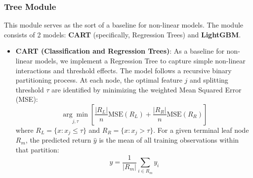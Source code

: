\documentclass[11pt]{article}
\begin{document}
\subsubsection{Tree Module}
This module serves as the sort of a baseline for non-linear models. The module consists of 2 models: \textbf{CART} (specifically, Regression Trees) and \textbf{LightGBM}.
\begin{itemize}
    \item \textbf{CART (Classification and Regression Trees)}:
    As a baseline for non-linear models, we implement a Regression Tree to capture simple non-linear interactions and threshold effects. The model follows a recursive binary partitioning process. At each node, the optimal feature $j$ and splitting threshold $\tau$ are identified by minimizing the weighted Mean Squared Error (MSE):
    \[
    \underset{j, \tau}{\arg\min} \left[ \frac{|R_L|}{n} \text{MSE}(R_L) + \frac{|R_R|}{n} \text{MSE}(R_R) \right]
    \]
    where $R_L = \{x : x_j \leq \tau\}$ and $R_R = \{x : x_j > \tau\}$. For a given terminal leaf node $R_m$, the predicted return $\hat{y}$ is the mean of all training observations within that partition:
    \[
    \hat{y} = \frac{1}{|R_m|} \sum_{i \in R_m} y_i
    \]


\end{itemize}
\end{document}
